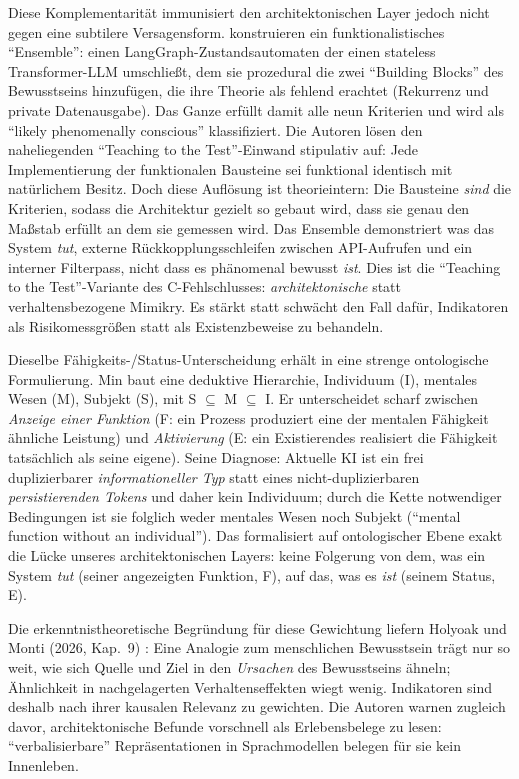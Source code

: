 \documentclass[acmlarge, noacm]{acmart}
\begin{document}
Diese Komplementarität immunisiert den architektonischen Layer jedoch nicht gegen eine subtilere Versagensform. \citet{tait2026} konstruieren ein funktionalistisches ``Ensemble'': einen LangGraph-Zustandsautomaten der einen stateless Transformer-LLM umschließt, dem sie prozedural die zwei ``Building Blocks'' des Bewusstseins hinzufügen, die ihre Theorie als fehlend erachtet (Rekurrenz und private Datenausgabe). Das Ganze erfüllt damit alle neun Kriterien und wird als ``likely phenomenally conscious'' klassifiziert. Die Autoren lösen den naheliegenden ``Teaching to the Test''-Einwand stipulativ auf: Jede Implementierung der funktionalen Bausteine sei funktional identisch mit natürlichem Besitz. Doch diese Auflösung ist theorieintern: Die Bausteine \textit{sind} die Kriterien, sodass die Architektur gezielt so gebaut wird, dass sie genau den Maßstab erfüllt an dem sie gemessen wird. Das Ensemble demonstriert was das System \textit{tut}, externe Rückkopplungsschleifen zwischen API-Aufrufen und ein interner Filterpass, nicht dass es phänomenal bewusst \textit{ist}. Dies ist die ``Teaching to the Test''-Variante des C-Fehlschlusses: \textit{architektonische} statt verhaltensbezogene Mimikry. Es stärkt statt schwächt den Fall dafür, Indikatoren als Risikomessgrößen statt als Existenzbeweise zu behandeln.

Dieselbe Fähigkeits-/Status-Unterscheidung erhält in \citet{min2026} eine strenge ontologische Formulierung. Min baut eine deduktive Hierarchie, Individuum (I), mentales Wesen (M), Subjekt (S), mit S $\subseteq$ M $\subseteq$ I. Er unterscheidet scharf zwischen \emph{Anzeige einer Funktion} (F: ein Prozess produziert eine der mentalen Fähigkeit ähnliche Leistung) und \emph{Aktivierung} (E: ein Existierendes realisiert die Fähigkeit tatsächlich als seine eigene). Seine Diagnose: Aktuelle KI ist ein frei duplizierbarer \emph{informationeller Typ} statt eines nicht-duplizierbaren \emph{persistierenden Tokens} und daher kein Individuum; durch die Kette notwendiger Bedingungen ist sie folglich weder mentales Wesen noch Subjekt (``mental function without an individual''). Das formalisiert auf ontologischer Ebene exakt die Lücke unseres architektonischen Layers: keine Folgerung von dem, was ein System \textit{tut} (seiner angezeigten Funktion, F), auf das, was es \textit{ist} (seinem Status, E).

Die erkenntnistheoretische Begründung für diese Gewichtung liefern Holyoak und Monti (2026, Kap.~9) \cite{holyoakmonti2026}: Eine Analogie zum menschlichen Bewusstsein trägt nur so weit, wie sich Quelle und Ziel in den \textit{Ursachen} des Bewusstseins ähneln; Ähnlichkeit in nachgelagerten Verhaltenseffekten wiegt wenig. Indikatoren sind deshalb nach ihrer kausalen Relevanz zu gewichten. Die Autoren warnen zugleich davor, architektonische Befunde vorschnell als Erlebensbelege zu lesen: ``verbalisierbare'' Repräsentationen in Sprachmodellen belegen für sie kein Innenleben.
\end{document}
